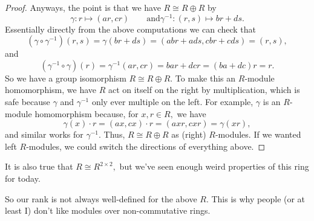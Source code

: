 \documentclass[../notes.tex]{subfiles}
\begin{document}
\begin{proof}
	Anyways, the point is that we have $R\cong R\oplus R$ by
	\[\gamma:r\mapsto(ar,cr)\qquad\text{and}\gamma^{-1}:(r,s)\mapsto br+ds.\]
	Essentially directly from the above computations we can check that
	\[\left(\gamma\circ\gamma^{-1}\right)(r,s)=\gamma(br+ds)=(abr+ads,cbr+cds)=(r,s),\]
	and
	\[\left(\gamma^{-1}\circ\gamma\right)(r)=\gamma^{-1}(ar,cr)=bar+dcr=(ba+dc)r=r.\]
	So we have a group isomorphism $R\cong R\oplus R.$ To make this an $R$-module homomorphism, we have $R$ act on itself on the right by multiplication, which is safe because $\gamma$ and $\gamma^{-1}$ only ever multiple on the left. For example, $\gamma$ is an $R$-module homomorphism because, for $x,r\in R,$ we have
	\[\gamma(x)\cdot r=(ax,cx)\cdot r=(axr,cxr)=\gamma(xr),\]
	and similar works for $\gamma^{-1}.$ Thus, $R\cong R\oplus R$ as (right) $R$-modules. If we wanted left $R$-modules, we could switch the directions of everything above.
\end{proof}
\begin{remark}
	It is also true that $R\cong R^{2\times2},$ but we've seen enough weird properties of this ring for today.
\end{remark}
So our rank is not always well-defined for the above $R.$ This is why people (or at least I) don't like modules over non-commutative rings.
\end{document}
